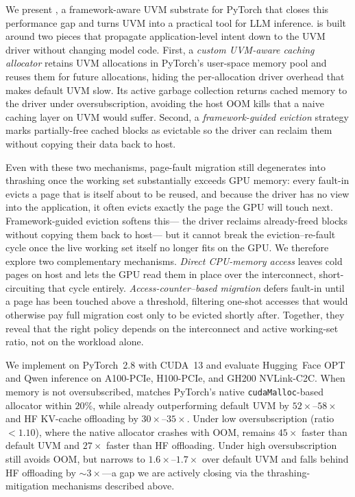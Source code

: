 We present {\uvmname}, a framework-aware UVM substrate for PyTorch
    that closes this performance gap and turns UVM
    into a practical tool for LLM inference.
{\uvmname} is built around two pieces that propagate
    application-level intent down to the UVM driver
    without changing model code.
First, a \emph{custom UVM-aware caching allocator}
    retains UVM allocations in PyTorch's user-space memory pool
    and reuses them for future allocations,
    hiding the per-allocation driver overhead
    that makes default UVM slow.
Its active garbage collection returns cached memory to the driver under oversubscription,
    avoiding the host OOM kills that a naive caching layer on UVM would suffer.
Second, a \emph{framework-guided eviction} strategy
    marks partially-free cached blocks as evictable
    so the driver can reclaim them without copying their data back to host.

Even with these two mechanisms, page-fault migration still degenerates into thrashing
    once the working set substantially exceeds GPU memory:
    every fault-in evicts a page that is itself about to be reused,
    and because the driver has no view into the application,
    it often evicts exactly the page the GPU will touch next.
Framework-guided eviction softens this---%
    the driver reclaims already-freed blocks without copying them back to host---%
    but it cannot break the eviction--re-fault cycle
    once the live working set itself no longer fits on the GPU.
We therefore explore two complementary mechanisms.
\emph{Direct CPU-memory access} leaves cold pages on host
    and lets the GPU read them in place over the interconnect,
    short-circuiting that cycle entirely.
\emph{Access-counter--based migration} defers fault-in until a page
    has been touched above a threshold,
    filtering one-shot accesses that would otherwise pay full migration cost
    only to be evicted shortly after.
Together, they reveal that the right policy depends on the interconnect
    and active working-set ratio, not on the workload alone.

We implement {\uvmname} on PyTorch~2.8 with CUDA~13
    and evaluate Hugging~Face OPT and Qwen inference
    on A100-PCIe, H100-PCIe, and GH200 NVLink-C2C.
When memory is not oversubscribed, {\uvmname} matches PyTorch's native
    \texttt{cudaMalloc}-based allocator within $20\%$,
    while already outperforming default UVM by $52\times$--$58\times$
    and HF KV-cache offloading by $30\times$--$35\times$.
Under low oversubscription (ratio $<1.10$), where the native allocator crashes with OOM,
    {\uvmname} remains $45\times$ faster than default UVM and $27\times$ faster than HF offloading.
Under high oversubscription {\uvmname} still avoids OOM,
    but narrows to $1.6\times$--$1.7\times$ over default UVM
    and falls behind HF offloading by $\sim\!3\times$---a gap we are actively closing
    via the thrashing-mitigation mechanisms described above.
